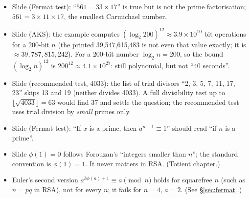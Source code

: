 \begin{fixbox}
\begin{itemize}
  \item Slide (Fermat test): ``$561 = 33 \times 17$'' is true but is not the prime factorisation; $561 = 3 \times 11 \times 17$, the smallest Carmichael number.
  \item Slide (AKS): the example computes $(\log_2 200)^{12} \approx 3.9 \times 10^{10}$ bit operations for a 200-bit $n$ (the printed 39,547,615,483 is not even that value exactly; it is $\approx 39{,}787{,}815{,}242$). For a 200-bit number $\log_2 n = 200$, so the bound $(\log_2 n)^{12}$ is $200^{12} \approx 4.1 \times 10^{27}$: still polynomial, but not ``40 seconds''.
  \item Slide (recommended test, 4033): the list of trial divisors ``2, 3, 5, 7, 11, 17, 23'' skips 13 and 19 (neither divides 4033). A full divisibility test up to $\lfloor\sqrt{4033}\rfloor = 63$ would find 37 and settle the question; the recommended test uses trial division by \emph{small} primes only.
  \item Slide (Fermat test): ``If $x$ is a prime, then $a^{n-1} \equiv 1$'' should read ``if $n$ is a prime''.
  \item Slide $\phi(1) = 0$ follows Forouzan's ``integers smaller than $n$''; the standard convention is $\phi(1) = 1$. It never matters in RSA. (Totient chapter.)
  \item Euler's second version $a^{k\phi(n)+1} \equiv a \pmod n$ holds for squarefree $n$ (such as $n = pq$ in RSA), not for every $n$; it fails for $n = 4$, $a = 2$. (See \S\ref{sec:fermat}.)
\end{itemize}
\end{fixbox}
